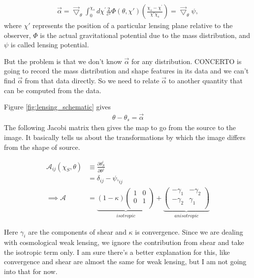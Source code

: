 \documentclass[12pt,a4paper]{article}
\begin{document}
\begin{align}
\vec{\alpha} =  \vec{\bigtriangledown}_{\theta}  \int_{0}^{\chi_s} d\chi^{\prime} \frac{2}{c^2}\Phi(\theta, \chi') \left(\frac{\chi_s - \chi^{\prime}}{\chi'  \chi_s}\right)  = \vec{\bigtriangledown}_{\theta} \psi, \label{eq:deflection_angle}
\end{align}
where $ \chi' $ represents the position of a particular lensing plane relative to the observer, $\Phi$ is the actual gravitational potential due to the mass distribution, and $\psi$ is called lensing potential.

But the problem is that we don't know $ \vec{\alpha} $ for any distribution. CONCERTO is going to record the mass distribution and shape features in its data and we can't find $ \vec{\alpha} $ from that data directly. So we need to relate $ \vec{\alpha} $ to another quantity that can be computed from the data.

Figure \ref{fig:lensing_schematic} gives
\begin{align}
\theta - \theta_s =  \vec{\alpha}
\end{align}
The following Jacobi matrix then gives the map to go from the source to the image. It basically tells us about the transformations by which the image differs from the shape of source.


\begin{align}
\mathcal{A}_{ij}(\chi_S, \theta) &\equiv \frac{\partial\theta_S^i}{\partial\theta^j} \\ 
&= \delta_{ij} - \psi,_{ij} \\
\implies
\mathcal{A} &= \underbrace{(1-\kappa) 
	\begin{pmatrix}
	1 & 0 \\
	0 & 1 \\
	\end{pmatrix}}_{isotropic}
+
\underbrace{
	\begin{pmatrix}
	- \gamma_1 & -\gamma_{2} \\
	-\gamma_{2} & \gamma_1 \\
	\end{pmatrix} 
}_{anisotropic} \label{eq:jacobi}
\end{align}

Here $\gamma_i$ are the components of shear and $ \kappa $ is convergence. Since we are dealing with cosmological weak lensing, we ignore the contribution from shear and take the isotropic term only. I am sure there's a better explanation for this, like convergence and shear are almost the same for weak lensing, but I am not going into that for now.
\end{document}
